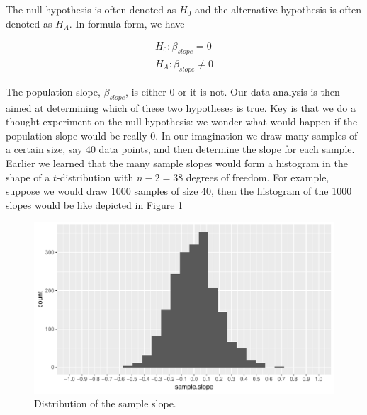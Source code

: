 \documentclass[]{report}\usepackage[]{graphicx}\usepackage[]{color}
\makeatletter
\def\maxwidth{ %
  \ifdim\Gin@nat@width>\linewidth
    \linewidth
  \else
    \Gin@nat@width
  \fi
}
\newenvironment{knitrout}{}{} %
\makeatother
\begin{document}
The null-hypothesis is often denoted as $H_0$ and the alternative hypothesis is often denoted as $H_A$. In formula form, we have


\begin{eqnarray}
H_0: \beta_{slope}=0 \\
H_A: \beta_{slope} \neq 0
\end{eqnarray}

The population slope, $\beta_{slope}$, is either 0 or it is not. Our data analysis is then aimed at determining which of these two hypotheses is true. Key is that we do a thought experiment on the null-hypothesis: we wonder what would happen if the population slope would be really 0. In our imagination we draw many samples of a certain size, say 40 data points, and then determine the slope for each sample. Earlier we learned that the many sample slopes would form a histogram in the shape of a $t$-distribution with $n-2=38$ degrees of freedom. For example, suppose we would draw 1000 samples of size 40, then the histogram of the 1000 slopes would be like depicted in Figure \ref{fig:inf_14}

\begin{knitrout}
\color{fgcolor}\begin{figure}

{\centering \includegraphics[width=\maxwidth]{figure/inf_14-1} 

}

\caption[Distribution of the sample slope]{Distribution of the sample slope.}\label{fig:inf_14}
\end{figure}


\end{knitrout}
\end{document}
